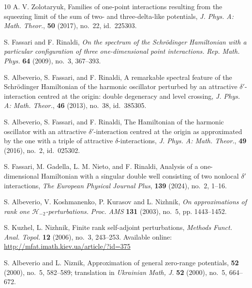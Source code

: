 \documentclass[reqno]{amsart}
\theoremstyle{definition}
\theoremstyle{remark}
\numberwithin{equation}{section}
\begin{document}
\begin{thebibliography}{10}
    A. V. Zolotaryuk,
    {Families of one-point interactions resulting from the squeezing limit of the sum of two- and
    three-delta-like potentials},
     \textit{J. Phys. A: Math. Theor.}, \textbf{50} (2017), no.~22, id.~225303.

    S. Fassari and F. Rinaldi,
     \textit{On the spectrum of the Schrödinger Hamiltonian with a particular configuration of three one-dimensional point interactions.}
     \textit{Rep. Math. Phys.} \textbf{64} (2009), no.~3, 367--393.

    S. Albeverio, S. Fassari, and F. Rinaldi,
    A remarkable spectral feature of the Schr\"odinger Hamiltonian of the harmonic oscillator perturbed by an attractive $\delta'$-interaction centred at the origin: double degeneracy and level crossing,
    \textit{J. Phys. A: Math. Theor.}, \textbf{46} (2013), no.~38, id.~385305.

    S. Albeverio, S. Fassari, and F. Rinaldi,
    The Hamiltonian of the harmonic oscillator with an attractive $\delta'$-interaction centred at the origin as approximated by the one with a triple of attractive $\delta$-interactions,
    \textit{J. Phys. A: Math. Theor.}, \textbf{49} (2016), no.~2, id.~025302.


    S. Fassari, M. Gadella, L. M. Nieto, and F. Rinaldi,
    Analysis of a one-dimensional Hamiltonian with a singular double well consisting of two nonlocal $\delta'$ interactions,
    \textit{The European Physical Journal Plus}, \textbf{139} (2024), no.~2, 1--16.

    S. Albeverio, V. Koshmanenko, P. Kurasov and L. Nizhnik,
  \textit{On approximations of rank one $\mathcal{H}_{-2}$-perturbations.}
    \textit{Proc. AMS} \textbf{131} (2003), no.~5, pp. 1443--1452.

    S. Kuzhel, L. Nizhnik,
    {Finite rank self-adjoint perturbations},
    \textit{Methods Funct. Anal. Topol.} \textbf{12} (2006), no.~3, 243--253. Available online:
    \url{http://mfat.imath.kiev.ua/article/?id=375}


    S. Albeverio and L. Niznik,
    Approximation of general zero-range potentials,
     \textbf{52} (2000), no.~5, 582--589; translation in
    \textit{Ukrainian Math, J.} \textbf{52} (2000), no.~5, 664--672.



\end{thebibliography}
\end{document}
